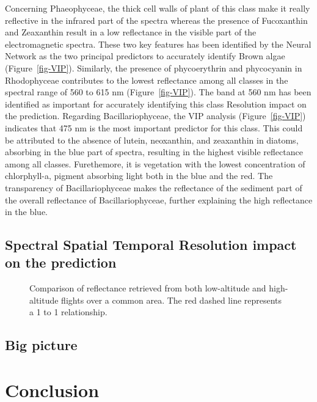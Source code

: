 \documentclass[
  number]{elsarticle}
\begin{document}
Concerning Phaeophyceae, the thick cell walls of plant of this class
make it really reflective in the infrared part of the spectra whereas
the presence of Fucoxanthin and Zeaxanthin result in a low reflectance
in the visible part of the electromagnetic spectra. These two key
features has been identified by the Neural Network as the two principal
predictors to accurately identify Brown algae (Figure~\ref{fig-VIP}).
Similarly, the presence of phycoerythrin and phycocyanin in Rhodophyceae
contributes to the lowest reflectance among all classes in the spectral
range of 560 to 615 nm (Figure~\ref{fig-VIP}). The band at 560 nm has
been identified as important for accurately identifying this class
Resolution impact on the prediction. Regarding Bacillariophyceae, the
VIP analysis (Figure~\ref{fig-VIP}) indicates that 475 nm is the most
important predictor for this class. This could be attributed to the
absence of lutein, neoxanthin, and zeaxanthin in diatoms, absorbing in
the blue part of spectra, resulting in the highest visible reflectance
among all classes. Furethemore, it is vegetation with the lowest
concentration of chlorphyll-a, pigment absorbing light both in the blue
and the red. The transparency of Bacillariophyceae makes the reflectance
of the sediment part of the overall reflectance of Bacillariophyceae,
further explaining the high reflectance in the blue.

\subsection{\texorpdfstring{\textbf{Spectral Spatial Temporal Resolution
impact on the
prediction}}{Spectral Spatial Temporal Resolution impact on the prediction}}\label{spectral-spatial-temporal-resolution-impact-on-the-prediction}

\label{cell-fig-CompareRef}
\begin{figure}[H]


\caption{\label{fig-CompareRef}Comparison of reflectance retrieved from
both low-altitude and high-altitude flights over a common area. The red
dashed line represents a 1 to 1 relationship.}

\end{figure}%

\subsection{Big picture}\label{big-picture}

\section{Conclusion}\label{conclusion}


\renewcommand\refname{Bibliography}
  
\end{document}
